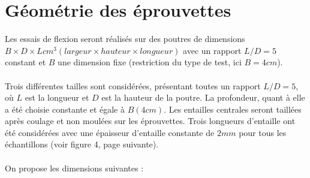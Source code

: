 \documentclass{DGC_M2_report}
\begin{document}
\section{Géométrie des éprouvettes}
Les essais de flexion seront réalisés sur des poutres de dimensions $B\times D\times L{} cm^3 (largeur \times{} hauteur
\times{} longueur)$ avec un rapport $L/D=5$ constant et $B$ une dimension fixe (restriction du type de test,
ici $B=4 cm$).
\\\\
Trois différentes tailles sont considérées, présentant toutes un rapport $L/D = 5$, où $L$ est la
longueur et $D$ est la hauteur de la poutre. La profondeur, quant à elle a été choisie constante et
égale à $B (4 cm)$. Les entailles centrales seront taillées après coulage et non moulées sur les
éprouvettes. Trois longueurs d’entaille ont été considérées avec une épaisseur d’entaille
constante de $2 mm$ pour tous les échantillons (voir figure 4, page suivante).
\\\\
On propose les dimensions suivantes :
\end{document}
